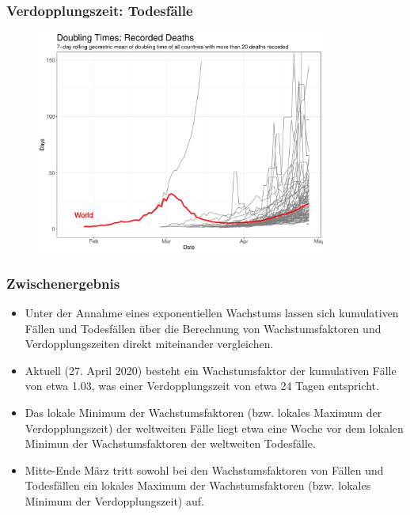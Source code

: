 \documentclass{beamer}
\begin{document}
\begin{frame}
	\frametitle{Verdopplungszeit: Todesfälle}
	\begin{figure}
		\centering
		\includegraphics[width = 270pt]{DT_deaths}
	\end{figure}
\end{frame}

 \begin{frame}
 	\frametitle{Zwischenergebnis}
 	\begin{itemize}
 		\item Unter der Annahme eines exponentiellen Wachstums lassen sich kumulativen Fällen und Todesfällen über die Berechnung von Wachstumsfaktoren und Verdopplungszeiten direkt miteinander vergleichen. 
 		\item Aktuell (27. April 2020) besteht ein Wachstumsfaktor der kumulativen Fälle von etwa 1.03, was einer Verdopplungszeit von etwa 24 Tagen entspricht.
 		\item Das lokale Minimum der Wachstumsfaktoren (bzw. lokales Maximum der Verdopplungszeit) der weltweiten Fälle liegt etwa eine Woche vor dem lokalen Minimun der Wachstumsfaktoren der weltweiten Todesfälle.
 		\item Mitte-Ende März tritt sowohl bei den Wachstumsfaktoren von Fällen und Todesfällen ein lokales Maximum der Wachstumsfaktoren (bzw. lokales Minimum der Verdopplungszeit) auf.
 	\end{itemize}
 \end{frame}
\end{document}
